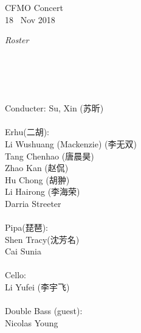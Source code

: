 \documentclass[letter,6pt,poets]{ConcProg}
\begin{document}
\begin{programme}{
    CFMO Concert
\\  {\normalsize 18 ~Nov 2018}
}
\begin{part}[]
  \end{part}
  
  
\end{programme}
\begin{center}
\Large\textsl{ Roster}
\end{center}

\begin{multicols}{2}%

\\
\\
\\

\\

Conducter: Su, Xin  (苏昕)
\\
\\
 Erhu(二胡):                 \\
Li Wushuang (Mackenzie) (李无双)   \\
Tang Chenhao  (唐晨昊) \\
Zhao Kan (赵侃)\\
Hu Chong (胡翀)\\
Li Hairong (李海荣)\\
Darria Streeter\\
\\
Pipa(琵琶):\\
Shen Tracy(沈芳名)\\
Cai Sunia\\

\\
Cello:\\
Li Yufei (李宇飞)\\
\\
Double Bass (guest):\\
Nicolas Young\\


\end{multicols}
\end{document}
